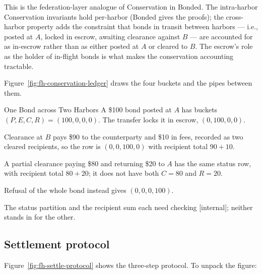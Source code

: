 \documentclass[11pt,a4paper]{article}
\theoremstyle{definition}
\theoremstyle{remark}
\begin{document}
This is the federation-layer analogue of Conservation in Bonded. The intra-harbor Conservation invariants hold per-harbor (Bonded gives the proofs); the cross-harbor property adds the constraint that bonds in transit between harbors --- i.e., posted at $A$, locked in escrow, awaiting clearance against $B$ --- are accounted for as in-escrow rather than as either posted at $A$ or cleared to $B$. The escrow's role as the holder of in-flight bonds is what makes the conservation accounting tractable.

Figure~\ref{fig:fh-conservation-ledger} draws the four buckets and the pipes between them.



\begin{pdexample}{One Bond across Two Harbors}
\setlength{\parskip}{4pt plus 1pt}
\pdbondrecipientexample
A \$100 bond posted at $A$ has buckets $(P,E,C,R)=(100,0,0,0)$. The transfer
locks it in escrow, $(0,100,0,0)$.

Clearance at $B$ pays \$90 to the
counterparty and \$10 in fees, recorded as two cleared recipients, so the row
is $(0,0,100,0)$ with recipient total $90+10$.

A partial clearance paying \$80
and returning \$20 to $A$ has the same status row, with recipient total $80+20$;
it does not have both $C=80$ and $R=20$.

Refusal of the whole bond instead gives
$(0,0,0,100)$.

The status partition and the recipient sum each need checking
[internal]; neither stands in for the other.
\end{pdexample}

\subsection{Settlement protocol}\label{sec:fh-settle-proto}

Figure~\ref{fig:fh-settle-protocol} shows the three-step protocol. To unpack the figure:


\end{document}
